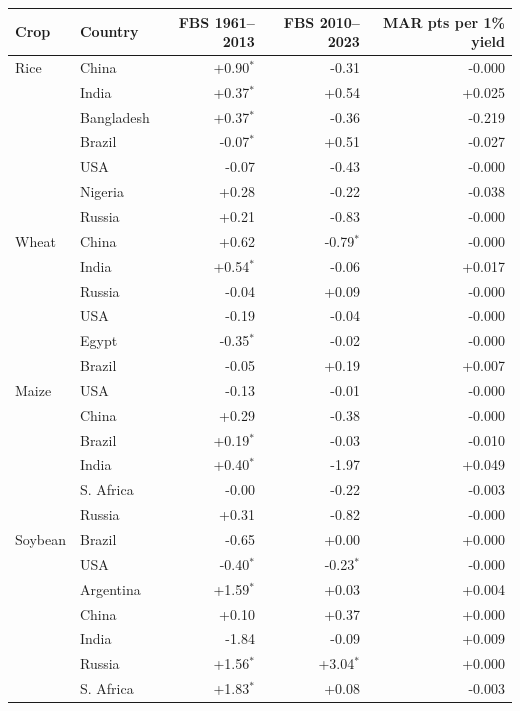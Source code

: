 \begin{tabular}{llrrr}
\toprule
Crop & Country & FBS 1961--2013 & FBS 2010--2023 & MAR pts per 1\% yield\\
\midrule
Rice & China & +0.90$^*$ & -0.31 & -0.000\\
 & India & +0.37$^*$ & +0.54 & +0.025\\
 & Bangladesh & +0.37$^*$ & -0.36 & -0.219\\
 & Brazil & -0.07$^*$ & +0.51 & -0.027\\
 & USA & -0.07 & -0.43 & -0.000\\
 & Nigeria & +0.28 & -0.22 & -0.038\\
 & Russia & +0.21 & -0.83 & -0.000\\
\midrule
Wheat & China & +0.62 & -0.79$^*$ & -0.000\\
 & India & +0.54$^*$ & -0.06 & +0.017\\
 & Russia & -0.04 & +0.09 & -0.000\\
 & USA & -0.19 & -0.04 & -0.000\\
 & Egypt & -0.35$^*$ & -0.02 & -0.000\\
 & Brazil & -0.05 & +0.19 & +0.007\\
\midrule
Maize & USA & -0.13 & -0.01 & -0.000\\
 & China & +0.29 & -0.38 & -0.000\\
 & Brazil & +0.19$^*$ & -0.03 & -0.010\\
 & India & +0.40$^*$ & -1.97 & +0.049\\
 & S. Africa & -0.00 & -0.22 & -0.003\\
 & Russia & +0.31 & -0.82 & -0.000\\
\midrule
Soybean & Brazil & -0.65 & +0.00 & +0.000\\
 & USA & -0.40$^*$ & -0.23$^*$ & -0.000\\
 & Argentina & +1.59$^*$ & +0.03 & +0.004\\
 & China & +0.10 & +0.37 & +0.000\\
 & India & -1.84 & -0.09 & +0.009\\
 & Russia & +1.56$^*$ & +3.04$^*$ & +0.000\\
 & S. Africa & +1.83$^*$ & +0.08 & -0.003\\
\bottomrule
\end{tabular}
